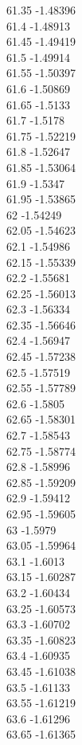 {61.35	-1.48396\\
61.4	-1.48913\\
61.45	-1.49419\\
61.5	-1.49914\\
61.55	-1.50397\\
61.6	-1.50869\\
61.65	-1.5133\\
61.7	-1.5178\\
61.75	-1.52219\\
61.8	-1.52647\\
61.85	-1.53064\\
61.9	-1.5347\\
61.95	-1.53865\\
62	-1.54249\\
62.05	-1.54623\\
62.1	-1.54986\\
62.15	-1.55339\\
62.2	-1.55681\\
62.25	-1.56013\\
62.3	-1.56334\\
62.35	-1.56646\\
62.4	-1.56947\\
62.45	-1.57238\\
62.5	-1.57519\\
62.55	-1.57789\\
62.6	-1.5805\\
62.65	-1.58301\\
62.7	-1.58543\\
62.75	-1.58774\\
62.8	-1.58996\\
62.85	-1.59209\\
62.9	-1.59412\\
62.95	-1.59605\\
63	-1.5979\\
63.05	-1.59964\\
63.1	-1.6013\\
63.15	-1.60287\\
63.2	-1.60434\\
63.25	-1.60573\\
63.3	-1.60702\\
63.35	-1.60823\\
63.4	-1.60935\\
63.45	-1.61038\\
63.5	-1.61133\\
63.55	-1.61219\\
63.6	-1.61296\\
63.65	-1.61365\\
}
